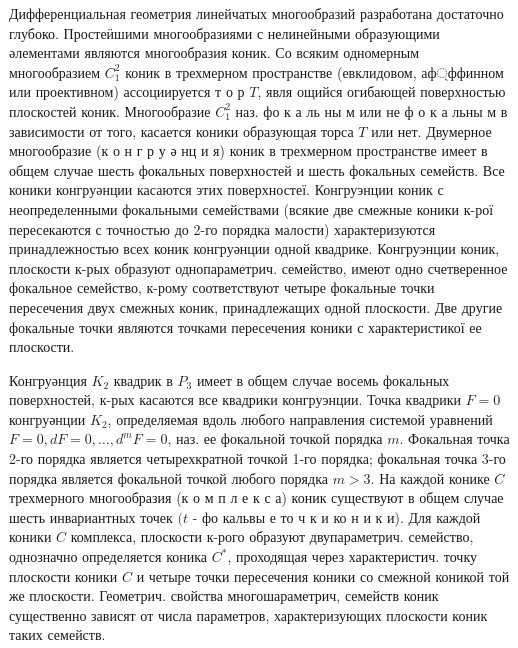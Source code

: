 \documentclass[10pt]{article}
\begin{document}
Дифференциальная геометрия линейчатых многообразий разработана достаточно глубоко. Простеӥшими многообразиями с нелинейными образующими әлементами являются многообразия коник. Со всяким одномерным многообразием $C_{1}^{2}$ коник в трехмерном пространстве (евклидовом, аф্ффинном или проективном) ассоциируется т о р $T$, явля ощийся огибающей поверхностью плоскостей коник. Многообразие $C_{1}^{2}$ наз. фо к а ль ны м или не ф о к а льны м в зависимости от того, касается коники образующая торса $T$ или нет. Двумерное многообразие (к о н г р у ә нц и я) коник в трехмерном пространстве имеет в общем случае шесть фокальных поверхностей и шесть фокальных семейств. Все коники конгруәнции касаются этих поверхностеї. Конгруэнции коник с неопределенными фокальными семействами (всякие две смежные коники к-рої пересекаются с точностью до 2-го порядка малости) характеризуются принадлежностью всех коник конгруәнции одной квадрике. Конгруэнции коник, плоскости к-рых образуют однопараметрич. семейство, имеют одно счетверенное фокальное семейство, к-рому соответствуют четыре фокальные точки пересечения двух смежных коник, принадлежащих одной плоскости. Две другие фокальные точки являются точками пересечения коники с характеристикої ее плоскости.



Конгруәнция $K_{2}$ квадрик в $P_{3}$ имеет в общем случае восемь фокальных поверхностей, к-рых касаются все квадрики конгруэнции. Точка квадрики $F=0$ конгруәнции $K_{2}$, определяемая вдоль любого направления системой уравнений $F=0, d F=0, \ldots, d^{m} F=0$, наз. ее фокальной точкой порядка $m$. Фокальная точка 2-го порядка является четырехкратной точкой 1-го порядка; фокальная точка 3-го порядка является фокальной точкой любого порядка $m>3$. На каждой конике $C$ трехмерного многообразия (к о м п л е к с а) коник существуют в общем случае шесть инвариантных точек $(t$ - фо кальвы е то ч к и ко н и к и). Для каждой коники $C$ комплекса, плоскости к-рого образуют двупараметрич. семейство, однозначно определяется коника $C^{*}$, проходящая через характеристич. точку плоскости коники $C$ и четыре точки пересечения коники со смежной коникой той же плоскости. Геометрич. свойства многошараметрич, семейств коник существенно зависят от числа параметров, характеризующих плоскости коник таких семейств.
\end{document}

